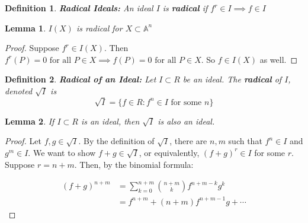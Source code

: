 \documentclass{article}
\newtheorem{definition}{Definition}[section]
\newtheorem{lemma}{Lemma}[section]
\begin{document}
\begin{definition}
    \textbf{Radical Ideals: } An ideal $I$ is \textbf{radical} if $f^r \in I \implies f \in I$
\end{definition}

\begin{lemma}
    $I(X)$ is radical for $X \subset \mathbb{A}^n$
\end{lemma}

\begin{proof}
    Suppose $f^r \in I(X)$. Then $f^r(P) = 0 \text{ for all } P \in X \implies f(P) = 0 \text{ for all } P \in X$. So $f \in I(X)$ as well.
\end{proof}

\begin{definition}
    \textbf{Radical of an Ideal: } Let $I \subset R$ be an ideal. The \textbf{radical} of $I$, denoted $\sqrt{I}$ is 
    \[ \sqrt{I} = \{ f \in R : f^n \in I \text{ for some $n$} \} \]
\end{definition}

\begin{lemma}
    If $I \subset R$ is an ideal, then $\sqrt{I}$ is also an ideal. 
\end{lemma}

\begin{proof}
    Let $f,g \in \sqrt{I}$. By the definition of $\sqrt{I}$, there are $n, m$ such that $f^n \in I$ and 
    $g^m \in I$. We want to show $f + g \in \sqrt{I}$, or equivalently, $(f+g)^r \in I$ for some $r$. Suppose $r = n+m$.
    Then, by the binomial formula:

    \begin{align*}
        (f+g)^{n+m}  &= \sum_{k=0}^{n+m} {n+m \choose k} f^{n+m-k}g^k \\
                &= f^{n+m} + (n+m)f^{n+m-1}g + \cdots 
    \end{align*}
    
\end{proof}
\end{document}
